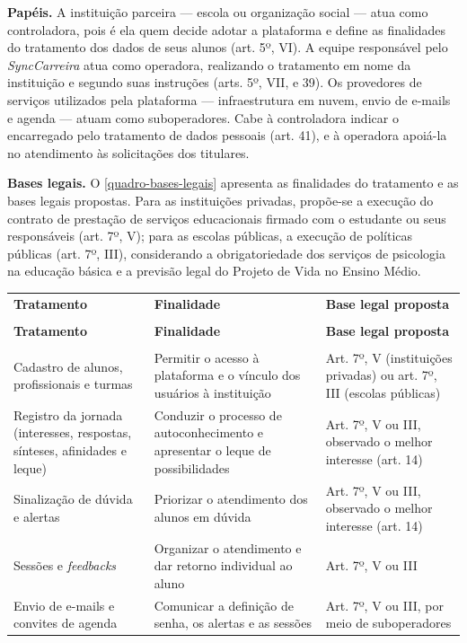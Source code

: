 \textbf{Papéis.} A instituição parceira --- escola ou organização social --- atua como controladora, pois é ela quem decide adotar a plataforma e define as finalidades do tratamento dos dados de seus alunos (art. 5º, VI). A equipe responsável pelo \textit{SyncCarreira} atua como operadora, realizando o tratamento em nome da instituição e segundo suas instruções (arts. 5º, VII, e 39). Os provedores de serviços utilizados pela plataforma --- infraestrutura em nuvem, envio de e-mails e agenda --- atuam como suboperadores. Cabe à controladora indicar o encarregado pelo tratamento de dados pessoais (art. 41), e à operadora apoiá-la no atendimento às solicitações dos titulares.

\textbf{Bases legais.} O \autoref{quadro-bases-legais} apresenta as finalidades do tratamento e as bases legais propostas. Para as instituições privadas, propõe-se a execução do contrato de prestação de serviços educacionais firmado com o estudante ou seus responsáveis (art. 7º, V); para as escolas públicas, a execução de políticas públicas (art. 7º, III), considerando a obrigatoriedade dos serviços de psicologia na educação básica e a previsão legal do Projeto de Vida no Ensino Médio.

{\ABNTEXfontereduzida
\renewcommand{\arraystretch}{1.25}
\begin{xltabular}{\textwidth}{|>{\raggedright\arraybackslash}p{3.6cm}|>{\raggedright\arraybackslash}X|>{\raggedright\arraybackslash}p{4.4cm}|}
 \\[0.3em]
\hline
\textbf{Tratamento} & \textbf{Finalidade} & \textbf{Base legal proposta} \\
\hline
\endfirsthead
{} \\
\hline
\textbf{Tratamento} & \textbf{Finalidade} & \textbf{Base legal proposta} \\
\hline
\endhead
{} \\
\endfoot
\endlastfoot
Cadastro de alunos, profissionais e turmas & Permitir o acesso à plataforma e o vínculo dos usuários à instituição & Art. 7º, V (instituições privadas) ou art. 7º, III (escolas públicas) \\
\hline
Registro da jornada (interesses, respostas, sínteses, afinidades e leque) & Conduzir o processo de autoconhecimento e apresentar o leque de possibilidades & Art. 7º, V ou III, observado o melhor interesse (art. 14) \\
\hline
Sinalização de dúvida e alertas & Priorizar o atendimento dos alunos em dúvida & Art. 7º, V ou III, observado o melhor interesse (art. 14) \\
\hline
Sessões e \textit{feedbacks} & Organizar o atendimento e dar retorno individual ao aluno & Art. 7º, V ou III \\
\hline
Envio de e-mails e convites de agenda & Comunicar a definição de senha, os alertas e as sessões & Art. 7º, V ou III, por meio de suboperadores \\
\hline
\end{xltabular}
}

